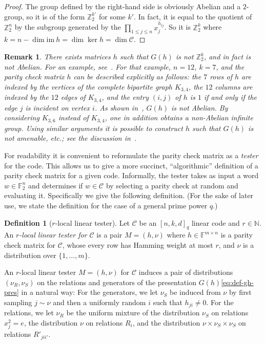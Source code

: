 \documentclass[11pt]{article}
\newtheorem{remark}[theorem]{Remark}
\theoremstyle{definition}
\newtheorem{definition}[theorem]{Definition}
\newcommand{\code}{\mathscr{C}}
\newcommand{\N}{\ensuremath{\mathbb{N}}}
\newcommand{\F}{\ensuremath{\mathbb{F}}}
\newcommand{\Z}{\ensuremath{\mathbb{Z}}}
\begin{document}
\begin{proof}
The group defined by the right-hand side is obviously Abelian and a $2$-group, so it is of the form $\Z_2^{k'}$ for some $k'$. In fact, it is equal to the quotient of $\Z_2^n$ by the subgroup generated by the $\prod_{1\leq j \leq n} x_j^{h_{ij}}$. So it is $\Z_2^k$ where $k=n-\dim\textrm{im}\ h = \dim\ker h=\dim \code$.  
\end{proof}

\begin{remark}\label{rk:non-abelian}
There exists matrices $h$ such that $G(h)$ is not $\Z_2^k$, and in fact is not Abelian. For an example, see~\cite[Example 2.16]{paddock2022arkhipov}. For that example, $n=12$, $k=7$, and the parity check matrix $h$ can be described explicitly as follows: the $7$ rows of $h$ are indexed by the vertices of the complete bipartite graph $K_{3,4}$, the $12$ columns are indexed by the $12$ edges of $K_{3,4}$, and the entry $(i,j)$ of $h$ is $1$ if and only if the edge $j$ is incident on vertex $i$. As shown in~\cite{paddock2022arkhipov}, $G(h)$ is not Abelian. By considering $K_{3,6}$ instead of $K_{3,4}$, one in addition obtains a non-Abelian \emph{infinite} group. Using similar arguments it is possible to construct $h$ such that $G(h)$ is not amenable, etc.; see the discussion in~\cite[Section 6]{paddock2022arkhipov}.
\end{remark}


For readability it is convenient to reformulate the parity check matrix as a \emph{tester} for the code. This allows us to give a more succinct, ``algorithmic'' definition of a parity check matrix for a given code. Informally, the tester takes as input a word $w\in \F_2^n$ and determines if $w\in \code$ by selecting a parity check at random and evaluating it. 
 Specifically we give the following definition. (For the sake of later use, we state the definition for the case of a general prime power $q$.)

\begin{definition}[$r$-local linear tester]\label{def:code-test}
Let $\code$ be an $[n,k,d]_q$ linear code and $r\in \N$.
An \emph{$r$-local linear tester for $\code$} is a pair $M = (h,\nu)$ where $h \in \F^{m \times n}$ is a parity check matrix for $\code$, whose every row has Hamming weight at most $r$, and $\nu$ is a distribution over $\{1,\ldots,m\}$. 
\end{definition}

An $r$-local linear tester $M=(h,\nu)$ for $\code$ induces a pair of distributions $(\nu_R,\nu_S)$ on the relations and generators of the presentation $G(h)$\eqref{eq:def-gh-pres} in a natural way: For the generators, we let $\nu_S$ be induced from $\nu$ by first sampling $j\sim \nu$ and then a uniformly random $i$ such that $h_{ji}\neq 0$. For the relations, we let $\nu_R$ be the uniform mixture of the distribution $\nu_S$ on relations $x_j^2=e$, the distribution $\nu$ on relations $R_i$, and the distribution $\nu\times \nu_S\times \nu_S$ on relations $R'_{jii'}$.
\end{document}
